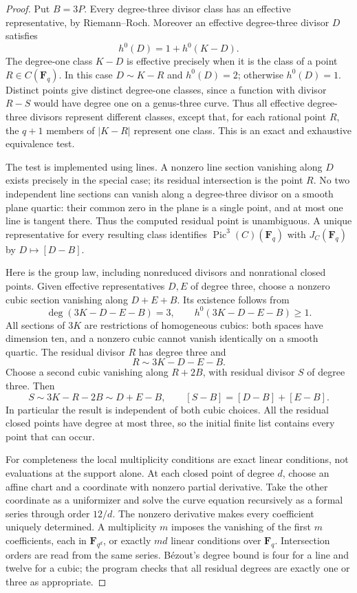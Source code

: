 \begin{proof}
Put $B=3P$. Every degree-three divisor class has an effective
representative, by Riemann--Roch. Moreover an effective
degree-three divisor $D$ satisfies
\[
             h^0(D)=1+h^0(K-D).
\]
The degree-one class $K-D$ is effective precisely when it is
the class of a point $R\in C(\mathbf F_q)$. In this case
$D\sim K-R$ and $h^0(D)=2$; otherwise $h^0(D)=1$.
Distinct points give distinct degree-one classes, since a
function with divisor $R-S$ would have degree one on a
genus-three curve. Thus all effective degree-three divisors
represent different classes, except that, for each rational
point $R$, the $q+1$ members of $|K-R|$ represent one class.
This is an exact and exhaustive equivalence test.

The test is implemented using lines. A nonzero line section
vanishing along $D$ exists precisely in the special case;
its residual intersection is the point $R$. No two independent
line sections can vanish along a degree-three divisor on a
smooth plane quartic: their common zero in the plane is a
single point, and at most one line is tangent there. Thus
the computed residual point is unambiguous. A unique
representative for every resulting class identifies
$\operatorname{Pic}^3(C)(\mathbf F_q)$ with
$J_C(\mathbf F_q)$ by $D\mapsto[D-B]$.

Here is the group law, including nonreduced divisors and
nonrational closed points. Given effective representatives
$D,E$ of degree three, choose a nonzero cubic section
vanishing along $D+E+B$. Its existence follows from
\[
 \deg(3K-D-E-B)=3,\qquad h^0(3K-D-E-B)\ge1.
\]
All sections of $3K$ are restrictions of homogeneous cubics:
both spaces have dimension ten, and a nonzero cubic cannot
vanish identically on a smooth quartic. The residual divisor
$R$ has degree three and
\[
                         R\sim3K-D-E-B.
\]
Choose a second cubic vanishing along $R+2B$, with residual
divisor $S$ of degree three. Then
\[
 S\sim3K-R-2B\sim D+E-B,
 \qquad [S-B]=[D-B]+[E-B].
\]
In particular the result is independent of both cubic choices.
All the residual closed points have degree at most three,
so the initial finite list contains every point that can occur.

For completeness the local multiplicity conditions are exact
linear conditions, not evaluations at the support alone. At
each closed point of degree $d$, choose an affine chart and
a coordinate with nonzero partial derivative. Take the other
coordinate as a uniformizer and solve the curve equation
recursively as a formal series through order $12/d$.
The nonzero derivative makes every coefficient uniquely
determined. A multiplicity $m$ imposes the vanishing of
the first $m$ coefficients, each in $\mathbf F_{q^d}$,
or exactly $md$ linear conditions over $\mathbf F_q$.
Intersection orders are read from the same series. B\'ezout's
degree bound is four for a line and twelve for a cubic;
the program checks that all residual degrees are exactly
one or three as appropriate.


\end{proof}
